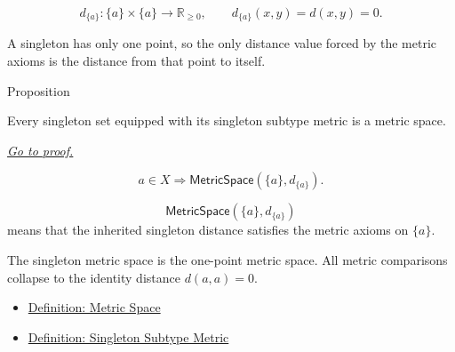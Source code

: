 \begin{remark*}
\[
d_{\{a\}}:\{a\}\times\{a\}\to\mathbb{R}_{\geq 0},
\qquad
d_{\{a\}}(x,y)=d(x,y)=0.
\]
\end{remark*}

\begin{remark*}[Interpretation]
A singleton has only one point, so the only distance value forced by the
metric axioms is the distance from that point to itself.
\end{remark*}


\DefinitionalRoot

\begin{propositionbox}{Proposition}
\begin{proposition}
\label{prop:singleton-set-metric-space}
Every singleton set equipped with its singleton subtype metric is a metric
space.

\smallskip
\noindent
\hyperref[prf:singleton-set-metric-space]{\textit{Go to proof.}}
\end{proposition}
\end{propositionbox}

\begin{remark*}
\[
a\in X
\Longrightarrow
\mathsf{MetricSpace}(\{a\},d_{\{a\}}).
\]
\end{remark*}

\begin{remark*}
\[
\mathsf{MetricSpace}(\{a\},d_{\{a\}})
\]
means that the inherited singleton distance satisfies the metric axioms on
\(\{a\}\).
\end{remark*}

\begin{remark*}[Interpretation]
The singleton metric space is the one-point metric space.  All metric
comparisons collapse to the identity distance \(d(a,a)=0\).
\end{remark*}


\begin{dependencies}
\begin{itemize}
  \item \hyperref[def:metric-space]{Definition: Metric Space}
  \item \hyperref[def:singleton-subtype-metric]{Definition: Singleton Subtype Metric}
\end{itemize}
\end{dependencies}


